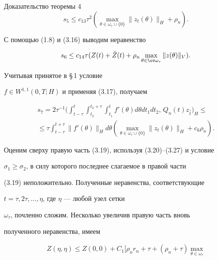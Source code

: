 \begin{pf*}{Доказательство теоремы 4}
\begin{equation}


s_5\le c_{13}\tau^2(\max\limits_


{\theta\in\omega_{\tau}\cup\{0\}}\|z_t(\theta)\|_H+\rho_n).


\end{equation}


С помощью (1.8) и (3.16) выводим  неравенство


\begin{equation}


s_6\le c_{14}\tau(Z(t)+\check Z(t)+\rho_n\max\limits_


{\theta\in\ov\omega_{\tau}}\|z(\theta)\|_V).


\end{equation}


Учитывая принятое в \S\,1 условие


$f\in W^{1,1}(0,T;H)$ и применяя (3.17), получаем


\begin{multline}


s_7 =2\tau^{-1}\bigg(\int_{t-\tau}^t\int_{t_2}^{t_2+\tau}\int_{t_1}^t


f'(\theta)d\theta dt_1dt_2,\,Q_n(t)z_{\overset{\,\circ}{t}}\bigg)_H\le \\


\le\tau\int_{t-\tau}^{t+\tau}\|f'(\theta)\|_Hd\theta(\max\limits_


{\theta\in\omega_{\tau}\cup\{0\}}\|z_t(\theta)\|_H+c_6\rho_n).


\end{multline}





Оценим сверху правую часть (3.19), используя (3.20)--(3.27) и условие


$\sigma_1\ge\sigma_2$, в силу которого последнее слагаемое в правой части


(3.19) неположительно. Полученные неравенства, соответствующие


$t=\tau,2\tau,\dotsc,\eta$, где $\eta$ --- любой узел сетки


$\omega_{\tau}$, почленно сложим. Несколько увеличив правую часть вновь


полученного неравенства, имеем


\begin{multline}


Z(\eta,\eta) \le Z(0,0)+C_1\bigg[\rho_nr_n+\tau


+(\rho_n+\tau)\max\limits_{\theta\in\omega_{\tau}


}
\end{multline}
\end{pf*}
